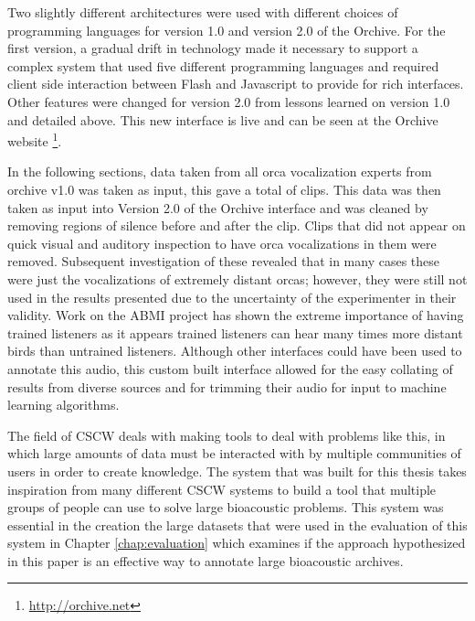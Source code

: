 \documentclass[12pt,oneside]{book}
\begin{document}
Two slightly different architectures were used with different choices
of programming languages for version 1.0 and version 2.0 of the
Orchive.  For the first version, a gradual drift in technology made it
necessary to support a complex system that used five different
programming languages and required client side interaction between
Flash and Javascript to provide for rich interfaces.  Other features
were changed for version 2.0 from lessons learned on version 1.0 and
detailed above.  This new interface is live and can be seen at the Orchive
website
\footnote{\url{http://orchive.net}}.

In the following sections, data taken from all orca vocalization
experts from orchive v1.0 was taken as input, this gave a total of
\totalAnnotations clips.  This data was then taken as input into
Version 2.0 of the Orchive interface and was cleaned by removing
regions of silence before and after the clip.  Clips that did not
appear on quick visual and auditory inspection to have orca
vocalizations in them were removed.  Subsequent investigation of these
revealed that in many cases these were just the vocalizations of
extremely distant orcas; however, they were still not used in the
results presented due to the uncertainty of the experimenter in their
validity.  Work on the ABMI project has shown the extreme importance
of having trained listeners as it appears trained listeners can hear
many times more distant birds than untrained listeners.  Although
other interfaces could have been used to annotate this audio, this
custom built interface allowed for the easy collating of results from
diverse sources and for trimming their audio for input to machine
learning algorithms.

The field of CSCW \cite{bannon1991cscw} deals with making tools to
deal with problems like this, in which large amounts of data must be
interacted with by multiple communities of users in order to create
knowledge.  The system that was built for this thesis takes
inspiration from many different CSCW systems to build a tool that
multiple groups of people can use to solve large bioacoustic problems.
This system was essential in the creation the large datasets that were
used in the evaluation of this system in Chapter \ref{chap:evaluation}
which examines if the approach hypothesized in this paper is an
effective way to annotate large bioacoustic archives.


\end{document}
